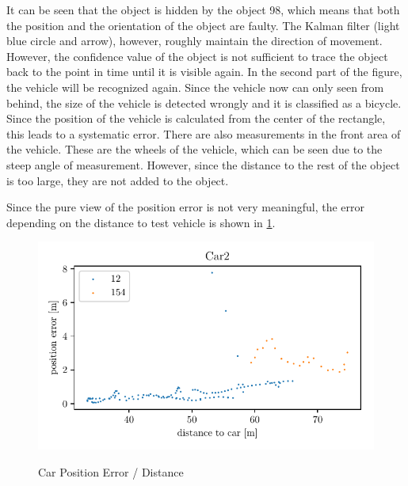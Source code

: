 \documentclass[11pt,oneside,openright]{mpreport}
\begin{document}
It can be seen that the object is hidden by the object 98, which means that both the position and the orientation of the object are faulty. 
The Kalman filter (light blue circle and arrow), however, roughly maintain the direction of movement.
However, the confidence value of the object is not sufficient to trace the object back to the point in time until it is visible again. 
In the second part of the figure, the vehicle will be recognized again. 
Since the vehicle  now can only seen from behind, the size of the vehicle is detected wrongly and it is classified as a bicycle.
Since the position of the vehicle is calculated from the center of the rectangle, this leads to a systematic error. 
There are also measurements in the front area of the vehicle. These are the wheels of the vehicle, which can be seen due to the steep angle of measurement. 
However, since the distance to the rest of the object is too large, they are not added to the object.

Since the pure view of the position error is not very meaningful, the error depending on the distance to test vehicle is shown in \cref{car_pos_err_dist}.

\begin{figure}[!htb]
  \caption{Car Position Error / Distance} 
  \centering
  \includegraphics[width=\textwidth]{bilder/Car2_pos_err_dist.pdf}
 \label{car_pos_err_dist}
\end{figure}

\end{document}
